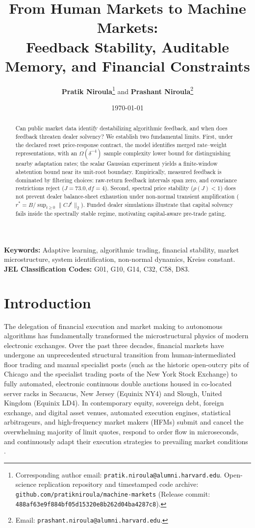 \documentclass[12pt]{article}
\title{\textbf{From Human Markets to Machine Markets:}\\[0.3em]
\Large Feedback Stability, Auditable Memory, and Financial Constraints}
\author{\textbf{Pratik Niroula}\thanks{Corresponding author email: \texttt{pratik.niroula@alumni.harvard.edu}. Open-science replication repository and timestamped code archive: \texttt{github.com/pratikniroula/machine-markets} (Release commit: \texttt{488af63e9f884bf05d15320e8b262d04ba4287c8}).} \quad and \quad \textbf{Prashant Niroula}\thanks{Email: \texttt{prashant.niroula@alumni.harvard.edu}.}}
\date{\today}
\theoremstyle{definition}
\theoremstyle{remark}
\begin{document}
\maketitle
\thispagestyle{empty}

\vspace{-0.5em}
\begin{abstract}
\noindent Can public market data identify destabilizing algorithmic feedback, and when does feedback threaten dealer solvency? We establish two fundamental limits. First, under the declared reset price-response contract, the model identifies merged rate--weight representations, with an $\Omega(\delta^{-4})$ sample complexity lower bound for distinguishing nearby adaptation rates; the scalar Gaussian experiment yields a finite-window abstention bound near its unit-root boundary. Empirically, measured feedback is dominated by filtering choices: raw-return feedback intervals span zero, and covariance restrictions reject ($J=73.0, df=4$). Second, spectral price stability ($\rho(J)<1$) does not prevent dealer balance-sheet exhaustion under non-normal transient amplification ($r^* = B / \sup_{t \ge 0} \|C J^t\|_2$). Funded dealer simulations illustrate that capital solvency fails inside the spectrally stable regime, motivating capital-aware pre-trade gating.
\end{abstract}

\vspace{1.0em}
\noindent\textbf{Keywords:} Adaptive learning, algorithmic trading, financial stability, market microstructure, system identification, non-normal dynamics, Kreiss constant.\\
\textbf{JEL Classification Codes:} G01, G10, G14, C32, C58, D83.

\newpage
\setcounter{page}{1}

\section{Introduction}
\label{sec:intro}

The delegation of financial execution and market making to autonomous algorithms has fundamentally transformed the microstructural physics of modern electronic exchanges. Over the past three decades, financial markets have undergone an unprecedented structural transition from human-intermediated floor trading and manual specialist posts (such as the historic open-outcry pits of Chicago and the specialist trading posts of the New York Stock Exchange) to fully automated, electronic continuous double auctions housed in co-located server racks in Secaucus, New Jersey (Equinix NY4) and Slough, United Kingdom (Equinix LD4). In contemporary equity, sovereign debt, foreign exchange, and digital asset venues, automated execution engines, statistical arbitrageurs, and high-frequency market makers (HFMs) submit and cancel the overwhelming majority of limit quotes, respond to order flow in microseconds, and continuously adapt their execution strategies to prevailing market conditions \citep{hasbrouck1991,menkveld2013,budish2015,biais2015}.
\end{document}
